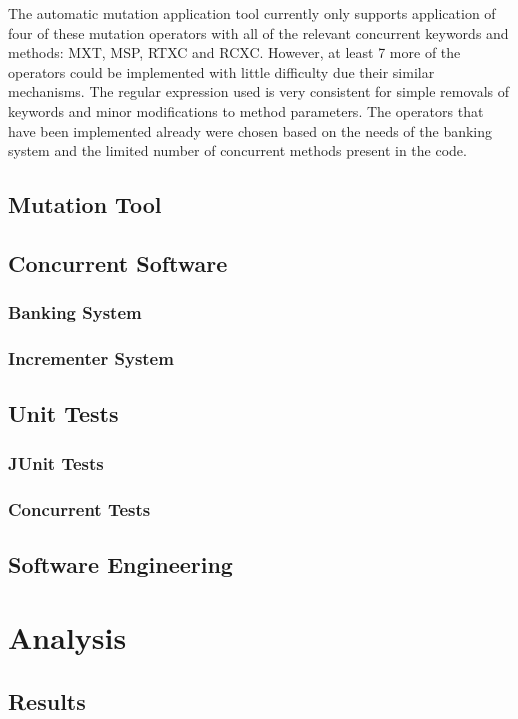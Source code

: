 \documentclass[a4paper,12pt]{article}
\begin{document}
The automatic mutation application tool currently only supports application of four of these mutation operators with all of the relevant concurrent keywords and methods: MXT, MSP, RTXC and RCXC. However, at least 7 more of the operators could be implemented with little difficulty due their similar mechanisms. The regular expression used is very consistent for simple removals of keywords and minor modifications to method parameters. The operators that have been implemented already were chosen based on the needs of the banking system and the limited number of concurrent methods present in the code.   
	
	
	
	
	\subsection{Mutation Tool}
	\subsection{Concurrent Software}
	    \subsubsection{Banking System}
	    \subsubsection{Incrementer System}
	\subsection{Unit Tests}
	    \subsubsection{JUnit Tests}
	    \subsubsection{Concurrent Tests}
    \subsection{Software Engineering}
	
	
\newpage	
\section{Analysis}
    \subsection{Results}
\end{document}
